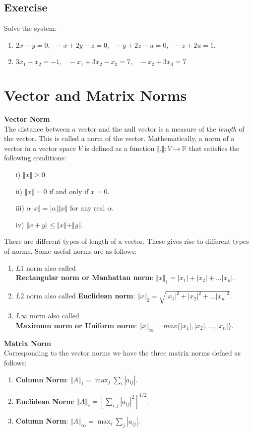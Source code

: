 \documentclass[aima203_lecturenotes_ku.tex]{subfiles}
\begin{document}
\subsection{Exercise}
Solve the system:
\begin{enumerate}
\item $2x-y=0, \;\; -x+2y-z=0, \;\; -y+2z-u=0, \;\; -z+2u=1$.
\item $3x_1 - x_2 = -1, \;\;\; -x_1+3x_2-x_3 = 7, \;\;\; -x_2+3x_3 =7$
\end{enumerate}
\section{Vector and Matrix Norms}
\textbf{Vector Norm} \\[1mm]
The distance between a vector and the null vector is a measure of the \textit{length} of the vector. This is called a norm of the vector. Mathematically, a norm of a vector in a vector space $V$ is defined as a function $\displaystyle \Vert .  \Vert : V \mapsto \mathbb{R}$ that satisfies the following conditions:
\begin{enumerate}
\item [i)] $\Vert x \Vert \geq 0$
\item [ii)] $\Vert x \Vert = 0$ if and only if $x=0$.
\item [iii)] $\alpha \Vert x \Vert = \vert \alpha \vert \Vert x \Vert $ for any real $\alpha$.
\item [iv)] $\Vert x + y \Vert \leq \Vert x \Vert + \Vert y \Vert$.
\end{enumerate}
There are different types of length of a vector. These gives rise to different types of norms. Some useful norms are as follows:
\begin{enumerate}
\item $L1$ norm also called \\
  \textbf{Rectangular norm or Manhattan norm}: $\Vert x \Vert _1 = |x_1| + |x_2| +... |x_n| $.
\item $L2$ norm also called \textbf{Euclidean norm}: $\Vert x \Vert _2 = \sqrt{|x_1|^2 + |x_2|^2 +... |x_n|^2} $.
\item $L\infty$ norm also called \\
  \textbf{Maximum norm or Uniform norm}: $\Vert x \Vert _{\infty} = max\{|x_1| , |x_2| ,..., |x_n|\} $.
\end{enumerate}
\noindent
\textbf{Matrix Norm} \\[1mm]
Corresponding to the vector norms we have the three matrix norms defned as follows:
\begin{enumerate}
\item \textbf{Column Norm}: $\displaystyle \Vert A \Vert _1 = \max_j \sum_i |a_{ij}|$.
\item \textbf{Euclidean Norm}: $\displaystyle \Vert A \Vert _e = \left [\sum_{i,j} |a_{ij}|^2 \right ] ^{1/2}$.
\item \textbf{Column Norm}: $\displaystyle \Vert A \Vert _{\infty} = \max_i \sum_j |a_{ij}|$.
\end{enumerate}
\end{document}

